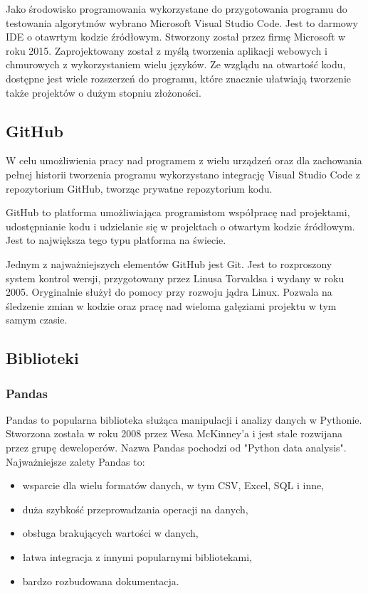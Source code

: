 \documentclass[12pt,twoside]{article}
\begin{document}
Jako środowisko programowania wykorzystane do przygotowania programu do testowania algorytmów
wybrano Microsoft Visual Studio Code. \cite{vsc}
Jest to darmowy IDE o otawrtym kodzie źródłowym. Stworzony został przez firmę Microsoft w roku 2015.
Zaprojektowany został z myślą tworzenia aplikacji webowych i chmurowych z wykorzystaniem wielu języków.
Ze wzglądu na otwartość kodu, dostępne jest wiele rozszerzeń do programu,
które znacznie ułatwiają tworzenie także projektów o dużym stopniu złożoności. \cite{vsc2}

\subsection{GitHub}

W celu umożliwienia pracy nad programem z wielu urządzeń oraz dla zachowania pełnej historii
tworzenia programu wykorzystano integrację Visual Studio Code z repozytorium GitHub, tworząc
prywatne repozytorium kodu. \cite{github}

GitHub to platforma umożliwiająca programistom współpracę nad projektami, udostępnianie kodu i
udzielanie się w projektach o otwartym kodzie źródłowym. Jest to największa tego typu platforma na świecie. \cite{github2}

Jednym z najważniejszych elementów GitHub jest Git. Jest to rozproszony system kontrol wersji,
przygotowany przez Linusa Torvaldsa i wydany w roku 2005. Oryginalnie służył do pomocy przy rozwoju jądra Linux.
Pozwala na śledzenie zmian w kodzie oraz pracę nad wieloma gałęziami projektu w tym samym czasie. \cite{git}

\subsection{Biblioteki}
\subsubsection{Pandas}

Pandas to popularna biblioteka służąca manipulacji i analizy danych w Pythonie.
Stworzona została w roku 2008 przez Wesa McKinney'a i jest stale rozwijana przez grupę deweloperów.
Nazwa Pandas pochodzi od "Python data analysis". \cite{pandas}
Najważniejsze zalety Pandas to:

\begin{itemize}[label=-,labelsep=0.4cm, leftmargin=1.25cm]
    \item wsparcie dla wielu formatów danych, w tym CSV, Excel, SQL i inne,
    \item duża szybkość przeprowadzania operacji na danych,
    \item obsługa brakujących wartości w danych,
    \item łatwa integracja z innymi popularnymi bibliotekami,
    \item bardzo rozbudowana dokumentacja.
\end{itemize}
\end{document}
